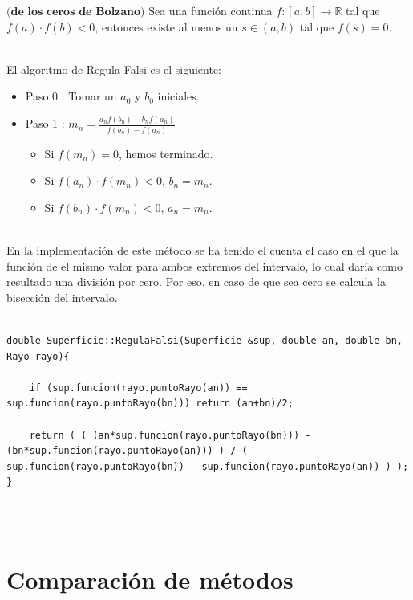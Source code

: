 \begin{teorema}\label{teo:bolzano}
	$\textbf{(de los ceros de Bolzano)}$ Sea una función continua $f : [a,b] \to \mathbb{R}$ tal que $f(a) \cdot f(b) < 0$, entonces existe al menos un $s \in (a,b)$ tal que $f(s) = 0$.
\end{teorema}
${ }$\\



El algoritmo de Regula-Falsi es el siguiente:

\begin{itemize}
	\item Paso 0 : Tomar un $a_0$ y $b_0$ iniciales.
	\item Paso 1 : $m_n = \frac{a_n f(b_n) - b_n f(a_n)}{f(b_n) - f(a_n)}$
	\begin{itemize}
		\item Si $f(m_n)=0$, hemos terminado.
		\item Si $f(a_n) \cdot f(m_n) < 0$, $b_n = m_n$.
		\item Si $f(b_n) \cdot f(m_n) < 0$, $a_n = m_n$.
	\end{itemize}
\end{itemize}
${ }$\\


En la implementación de este método se ha tenido el cuenta el caso en el que la función de el mismo valor para ambos extremos del intervalo, lo cual daría como resultado una división por cero. Por eso, en caso de que sea cero se calcula la bisección del intervalo.
${ }$\\

\begin{lstlisting}[style=Consola]

double Superficie::RegulaFalsi(Superficie &sup, double an, double bn, Rayo rayo){

	if (sup.funcion(rayo.puntoRayo(an)) == sup.funcion(rayo.puntoRayo(bn))) return (an+bn)/2;
	
	return ( ( (an*sup.funcion(rayo.puntoRayo(bn))) - (bn*sup.funcion(rayo.puntoRayo(an))) ) / ( sup.funcion(rayo.puntoRayo(bn)) - sup.funcion(rayo.puntoRayo(an)) ) );
}

\end{lstlisting}
${ }$\\




${ }$\\
\section{Comparación de métodos}
${ }$\\


